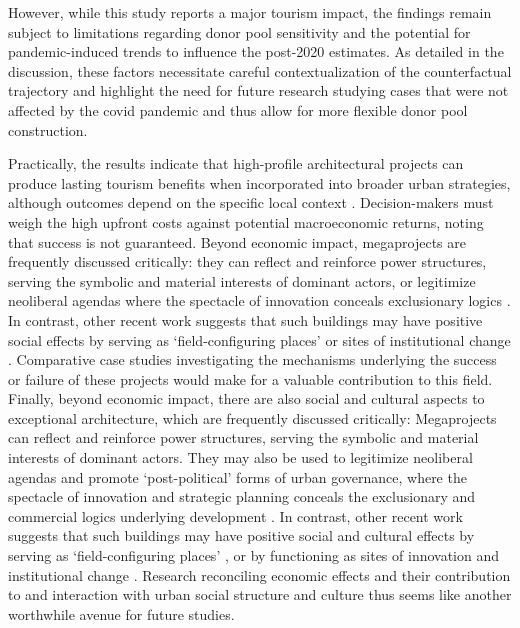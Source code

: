\documentclass[a4paper, 12pt]{article}
\begin{document}
However, while this study reports a major tourism impact, the findings remain subject to limitations regarding donor pool sensitivity and the potential for pandemic-induced trends to influence the post-2020 estimates. As detailed in the discussion, these factors necessitate careful contextualization of the counterfactual trajectory and highlight the need for future research studying cases that were not affected by the covid pandemic and thus allow for more flexible donor pool construction.

Practically, the results indicate that high-profile architectural projects can produce lasting tourism benefits when incorporated into broader urban strategies, although outcomes depend on the specific local context \citep{alaily-mattar2020a}. Decision-makers must weigh the high upfront costs against potential macroeconomic returns, noting that success is not guaranteed. Beyond economic impact, megaprojects are frequently discussed critically: they can reflect and reinforce power structures, serving the symbolic and material interests of dominant actors, or legitimize neoliberal agendas where the spectacle of innovation conceals exclusionary logics \citep{novy2019, balke2018}. In contrast, other recent work suggests that such buildings may have positive social effects by serving as `field-configuring places' \citep{capron2024} or sites of institutional change \citep{dreher2022}. Comparative case studies investigating the mechanisms underlying the success or failure of these projects would make for a valuable contribution to this field. Finally, beyond economic impact, there are also social and cultural aspects to exceptional architecture, which are frequently discussed critically: Megaprojects can reflect and reinforce power structures, serving the symbolic and material interests of dominant actors. They may also be used to legitimize neoliberal agendas and promote `post-political' forms of urban governance, where the spectacle of innovation and strategic planning conceals the exclusionary and commercial logics underlying development \citep{novy2019, balke2018, hausler2024, bassols2019}. In contrast, other recent work suggests that such buildings may have positive social and cultural effects by serving as `field-configuring places' \citep{capron2024}, or by functioning as sites of innovation and institutional change \citep{dreher2022, lawrence2015}. Research reconciling economic effects and their contribution to and interaction with urban social structure and culture thus seems like another worthwhile avenue for future studies.
\end{document}
